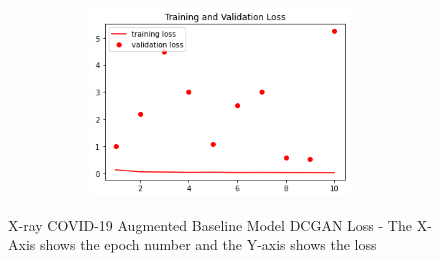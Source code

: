  \begin{figure}[H]
    \centering
    \includegraphics[width=1\textwidth,height=5cm,keepaspectratio]{Images/X-ray COVID-19 dataset CNN Train and Val Loss Augmented DCGAN.png}\\
    \caption{X-ray COVID-19 Augmented Baseline Model DCGAN Loss - The X-Axis shows the epoch number and the Y-axis shows the loss}
    \label{fig:X-ray COVID-19 Augmented Baseline Model DCGAN Loss}
\end{figure}
